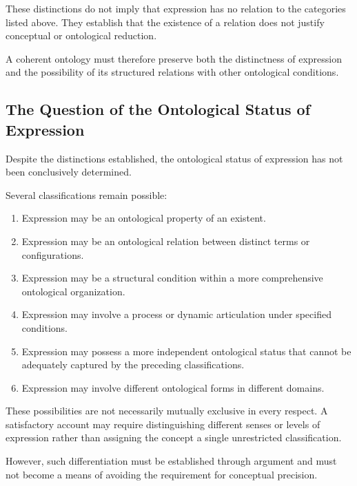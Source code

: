 These distinctions do not imply that expression has
no relation to the categories listed above. They
establish that the existence of a relation does not
justify conceptual or ontological reduction.

A coherent ontology must therefore preserve both
the distinctness of expression and the possibility
of its structured relations with other ontological
conditions.

\subsection{The Question of the Ontological Status of Expression}

Despite the distinctions established, the ontological
status of expression has not been conclusively determined.

Several classifications remain possible:

\begin{enumerate}
    \item Expression may be an ontological property
    of an existent.

    \item Expression may be an ontological relation
    between distinct terms or configurations.

    \item Expression may be a structural condition
    within a more comprehensive ontological organization.

    \item Expression may involve a process or dynamic
    articulation under specified conditions.

    \item Expression may possess a more independent
    ontological status that cannot be adequately
    captured by the preceding classifications.

    \item Expression may involve different ontological
    forms in different domains.
\end{enumerate}

These possibilities are not necessarily mutually exclusive
in every respect. A satisfactory account may require
distinguishing different senses or levels of expression
rather than assigning the concept a single unrestricted
classification.

However, such differentiation must be established
through argument and must not become a means of
avoiding the requirement for conceptual precision.

